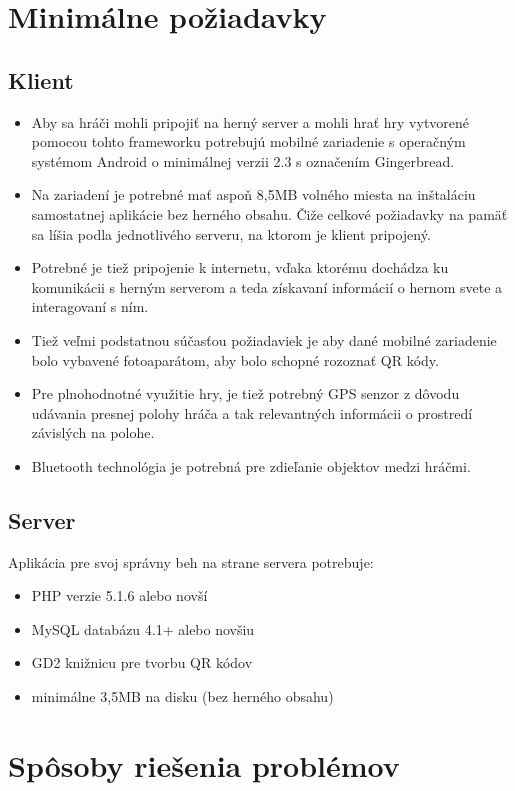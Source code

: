 \section{Minimálne požiadavky}
\subsection{Klient}
\begin{itemize}
\item Aby sa hráči mohli pripojiť na herný server a mohli hrať hry vytvorené pomocou tohto frameworku potrebujú mobilné zariadenie s operačným systémom Android o minimálnej verzii 2.3 s označením Gingerbread. 
\item Na zariadení je potrebné mať aspoň 8,5MB volného miesta na inštaláciu samostatnej aplikácie bez herného obsahu. Čiže celkové požiadavky na pamäť sa líšia podla jednotlivého serveru, na ktorom je klient pripojený. 
\item Potrebné je tiež pripojenie k internetu, vďaka ktorému dochádza ku komunikácii s herným serverom a teda získavaní informácií o hernom svete a interagovaní s ním. 
\item Tiež veľmi podstatnou súčasťou požiadaviek je aby dané mobilné zariadenie bolo vybavené fotoaparátom, aby bolo schopné rozoznať QR kódy. 
\item Pre plnohodnotné využitie hry, je tiež potrebný GPS senzor z dôvodu udávania presnej polohy hráča a tak relevantných informácii o prostredí závislých na polohe. 
\item Bluetooth technológia je potrebná pre zdieľanie objektov medzi hráčmi. 
\end{itemize}

\subsection{Server}
Aplikácia pre svoj správny beh na strane servera potrebuje:
\begin{itemize}
\item PHP verzie 5.1.6 alebo novší \cite{codeigniter-requirements}
\item MySQL databázu 4.1+ alebo novšiu \cite{codeigniter-requirements}
\item GD2 knižnicu pre tvorbu QR kódov \cite{qrgenerator-info}
\item minimálne 3,5MB na disku (bez herného obsahu)
\end{itemize}

\section{Spôsoby riešenia problémov}

